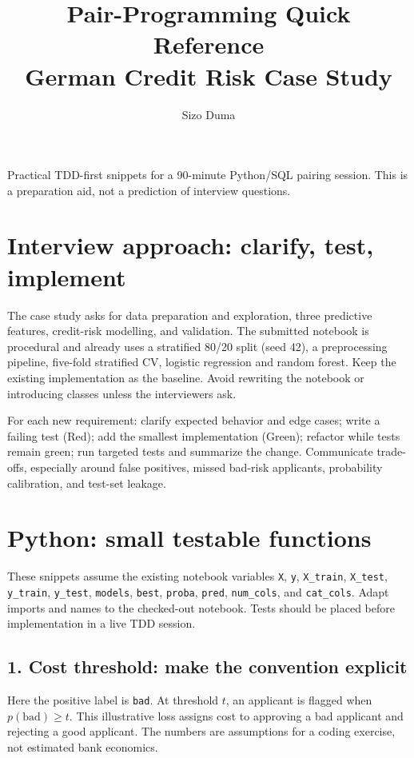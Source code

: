 \documentclass[10pt]{article}
\title{Pair-Programming Quick Reference\\\large German Credit Risk Case Study}
\author{Sizo Duma}
\date{}
\begin{document}
\maketitle
\begin{center}\small Practical TDD-first snippets for a 90-minute Python/SQL pairing session. This is a preparation aid, not a prediction of interview questions.\end{center}

\section{Interview approach: clarify, test, implement}
The case study asks for data preparation and exploration, three predictive features, credit-risk modelling, and validation. The submitted notebook is procedural and already uses a stratified 80/20 split (seed 42), a preprocessing pipeline, five-fold stratified CV, logistic regression and random forest. Keep the existing implementation as the baseline. Avoid rewriting the notebook or introducing classes unless the interviewers ask.

For each new requirement: clarify expected behavior and edge cases; write a failing test (Red); add the smallest implementation (Green); refactor while tests remain green; run targeted tests and summarize the change. Communicate trade-offs, especially around false positives, missed bad-risk applicants, probability calibration, and test-set leakage.

\section{Python: small testable functions}
These snippets assume the existing notebook variables \texttt{X}, \texttt{y}, \texttt{X\_train}, \texttt{X\_test}, \texttt{y\_train}, \texttt{y\_test}, \texttt{models}, \texttt{best}, \texttt{proba}, \texttt{pred}, \texttt{num\_cols}, and \texttt{cat\_cols}. Adapt imports and names to the checked-out notebook. Tests should be placed before implementation in a live TDD session.

\subsection{1. Cost threshold: make the convention explicit}
Here the positive label is \texttt{bad}. At threshold $t$, an applicant is flagged when $p(\mathrm{bad})\geq t$. This illustrative loss assigns cost to approving a bad applicant and rejecting a good applicant. The numbers are assumptions for a coding exercise, not estimated bank economics.
\end{document}
